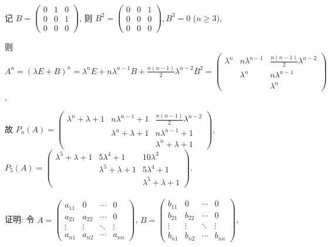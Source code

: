 		 记 $B = \begin{pmatrix}
				 0 & 1 & 0 \\
				 0 & 0 & 1 \\
				 0 & 0 & 0
			 \end{pmatrix}$, 则 $B^2 = \begin{pmatrix}
				 0 & 0 & 1 \\
				 0 & 0 & 0 \\
				 0 & 0 & 0
			 \end{pmatrix}, B^3 = 0$ ($n \geq 3$),

		 则 $A^n = (\lambda E + B)^n = \lambda^n E + n \lambda^{n-1} B + \frac{n(n-1)}{2} \lambda^{n-2} B^2 = \begin{pmatrix}
				 \lambda^n & n\lambda^{n-1} & \frac{n(n-1)}{2}\lambda^{n-2} \\
				           & \lambda^n      & n\lambda^{n-1}                \\
				           &                & \lambda^n
			 \end{pmatrix}$,

		 故 $P_n(A) = \begin{pmatrix}
				 \lambda^n + \lambda + 1 & n\lambda^{n-1} + 1      & \frac{n(n-1)}{2}\lambda^{n-2} \\
				                         & \lambda^n + \lambda + 1 & n\lambda^{n-1} + 1            \\
				                         &                         & \lambda^n + \lambda + 1
			 \end{pmatrix}$,
		 $P_5(A) = \begin{pmatrix}
				 \lambda^5 + \lambda + 1 & 5\lambda^4 + 1          & 10\lambda^3             \\
				                         & \lambda^5 + \lambda + 1 & 5\lambda^4 + 1          \\
				                         &                         & \lambda^5 + \lambda + 1
			 \end{pmatrix}$.


	 \paragraph{} %
		 证明: 令 $A = \begin{pmatrix}
				 a_{11} & 0      & \cdots & 0      \\
				 a_{21} & a_{22} & \cdots & 0      \\
				 \vdots & \vdots & \ddots & \vdots \\
				 a_{n1} & a_{n2} & \cdots & a_{nn}
			 \end{pmatrix}$, $B = \begin{pmatrix}
				 b_{11} & 0      & \cdots & 0      \\
				 b_{21} & b_{22} & \cdots & 0      \\
				 \vdots & \vdots & \ddots & \vdots \\
				 b_{n1} & b_{n2} & \cdots & b_{nn}
			 \end{pmatrix}$,

